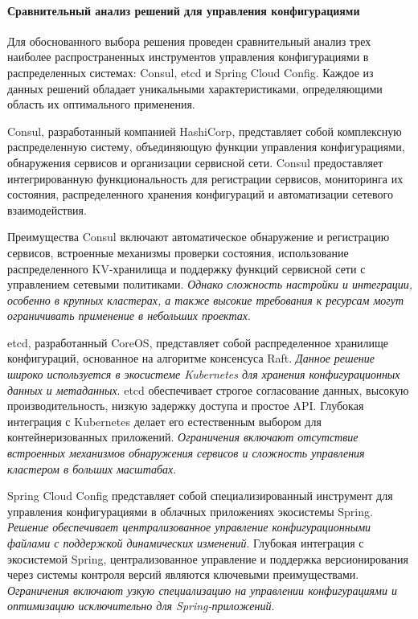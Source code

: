 \paragraph{Сравнительный анализ решений для управления конфигурациями}

Для обоснованного выбора решения проведен сравнительный анализ трех наиболее распространенных инструментов управления конфигурациями в распределенных системах: Consul, etcd и Spring Cloud Config. Каждое из данных решений обладает уникальными характеристиками, определяющими область их оптимального применения.

Consul, разработанный компанией HashiCorp, представляет собой комплексную распределенную систему, объединяющую функции управления конфигурациями, обнаружения сервисов и организации сервисной сети. Consul предоставляет интегрированную функциональность для регистрации сервисов, мониторинга их состояния, распределенного хранения конфигураций и автоматизации сетевого взаимодействия.

Преимущества Consul включают автоматическое обнаружение и регистрацию сервисов, встроенные механизмы проверки состояния, использование распределенного KV-хранилища и поддержку функций сервисной сети с управлением сетевыми политиками. \textit{Однако сложность настройки и интеграции, особенно в крупных кластерах, а также высокие требования к ресурсам могут ограничивать применение в небольших проектах}.

etcd, разработанный CoreOS, представляет собой распределенное хранилище конфигураций, основанное на алгоритме консенсуса Raft. \textit{Данное решение широко используется в экосистеме Kubernetes для хранения конфигурационных данных и метаданных}.
etcd обеспечивает строгое согласование данных, высокую производительность, низкую задержку доступа и простое API. Глубокая интеграция с Kubernetes делает его естественным выбором для контейнеризованных приложений. \textit{Ограничения включают отсутствие встроенных механизмов обнаружения сервисов и сложность управления кластером в больших масштабах}.

Spring Cloud Config представляет собой специализированный инструмент для управления конфигурациями в облачных приложениях экосистемы Spring. \textit{Решение обеспечивает централизованное управление конфигурационными файлами с поддержкой динамических изменений}.
Глубокая интеграция с экосистемой Spring, централизованное управление и поддержка версионирования через системы контроля версий являются ключевыми преимуществами. \textit{Ограничения включают узкую специализацию на управлении конфигурациями и оптимизацию исключительно для Spring-приложений}.

